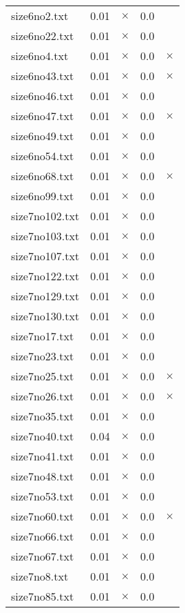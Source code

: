 \documentclass{article}
\begin{document}
\begin{center}
\begin{tabular}{lrrrr}
size6no2.txt & 0.01 & 
$\times$
 & 0.0 & 
\\
size6no22.txt & 0.01 & 
$\times$
 & 0.0 & 
\\
size6no4.txt & 0.01 & 
$\times$
 & 0.0 & 
$\times$
\\
size6no43.txt & 0.01 & 
$\times$
 & 0.0 & 
$\times$
\\
size6no46.txt & 0.01 & 
$\times$
 & 0.0 & 
\\
size6no47.txt & 0.01 & 
$\times$
 & 0.0 & 
$\times$
\\
size6no49.txt & 0.01 & 
$\times$
 & 0.0 & 
\\
size6no54.txt & 0.01 & 
$\times$
 & 0.0 & 
\\
size6no68.txt & 0.01 & 
$\times$
 & 0.0 & 
$\times$
\\
size6no99.txt & 0.01 & 
$\times$
 & 0.0 & 
\\
size7no102.txt & 0.01 & 
$\times$
 & 0.0 & 
\\
size7no103.txt & 0.01 & 
$\times$
 & 0.0 & 
\\
size7no107.txt & 0.01 & 
$\times$
 & 0.0 & 
\\
size7no122.txt & 0.01 & 
$\times$
 & 0.0 & 
\\
size7no129.txt & 0.01 & 
$\times$
 & 0.0 & 
\\
size7no130.txt & 0.01 & 
$\times$
 & 0.0 & 
\\
size7no17.txt & 0.01 & 
$\times$
 & 0.0 & 
\\
size7no23.txt & 0.01 & 
$\times$
 & 0.0 & 
\\
size7no25.txt & 0.01 & 
$\times$
 & 0.0 & 
$\times$
\\
size7no26.txt & 0.01 & 
$\times$
 & 0.0 & 
$\times$
\\
size7no35.txt & 0.01 & 
$\times$
 & 0.0 & 
\\
size7no40.txt & 0.04 & 
$\times$
 & 0.0 & 
\\
size7no41.txt & 0.01 & 
$\times$
 & 0.0 & 
\\
size7no48.txt & 0.01 & 
$\times$
 & 0.0 & 
\\
size7no53.txt & 0.01 & 
$\times$
 & 0.0 & 
\\
size7no60.txt & 0.01 & 
$\times$
 & 0.0 & 
$\times$
\\
size7no66.txt & 0.01 & 
$\times$
 & 0.0 & 
\\
size7no67.txt & 0.01 & 
$\times$
 & 0.0 & 
\\
size7no8.txt & 0.01 & 
$\times$
 & 0.0 & 
\\
size7no85.txt & 0.01 & 
$\times$
 & 0.0 & 
\\
\hline\end{tabular}
\end{center}
\end{document}
